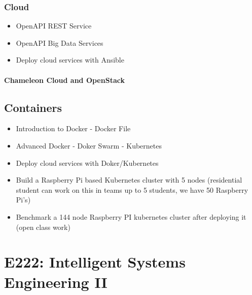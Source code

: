 \subsection{Cloud}


\begin{itemize}
\item OpenAPI REST Service
\item OpenAPI Big Data Services
\item Deploy cloud services with Ansible
\end{itemize}

\subsubsection{Chameleon Cloud and OpenStack}



\section{Containers}

\begin{itemize}
\item Introduction to Docker - Docker File
\item Advanced Docker - Doker Swarm -  Kubernetes
\item Deploy cloud services with Doker/Kubernetes
\item Build a Raspberry Pi based Kubernetes cluster with 5 nodes
  (residential student can work on this in teams up to 5 students, we
  have 50 Raspberry Pi's)
\item Benchmark a 144 node Raspberry PI kubernetes cluster after
  deploying it (open class work)
\end{itemize}

\chapter{E222: Intelligent Systems Engineering II}


